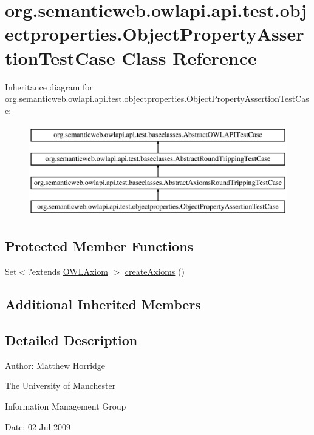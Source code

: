 \hypertarget{classorg_1_1semanticweb_1_1owlapi_1_1api_1_1test_1_1objectproperties_1_1_object_property_assertion_test_case}{\section{org.\-semanticweb.\-owlapi.\-api.\-test.\-objectproperties.\-Object\-Property\-Assertion\-Test\-Case Class Reference}
\label{classorg_1_1semanticweb_1_1owlapi_1_1api_1_1test_1_1objectproperties_1_1_object_property_assertion_test_case}
}
Inheritance diagram for org.\-semanticweb.\-owlapi.\-api.\-test.\-objectproperties.\-Object\-Property\-Assertion\-Test\-Case\-:\begin{figure}[H]
\begin{center}
\leavevmode
\includegraphics[height=4.000000cm]{classorg_1_1semanticweb_1_1owlapi_1_1api_1_1test_1_1objectproperties_1_1_object_property_assertion_test_case}
\end{center}
\end{figure}
\subsection*{Protected Member Functions}
\begin{DoxyCompactItemize}
\item 
Set$<$?extends \hyperlink{interfaceorg_1_1semanticweb_1_1owlapi_1_1model_1_1_o_w_l_axiom}{O\-W\-L\-Axiom} $>$ \hyperlink{classorg_1_1semanticweb_1_1owlapi_1_1api_1_1test_1_1objectproperties_1_1_object_property_assertion_test_case_af3061f21e20089901a40e6e73656a12f}{create\-Axioms} ()
\end{DoxyCompactItemize}
\subsection*{Additional Inherited Members}


\subsection{Detailed Description}
Author\-: Matthew Horridge\par
 The University of Manchester\par
 Information Management Group\par
 Date\-: 02-\/\-Jul-\/2009 

